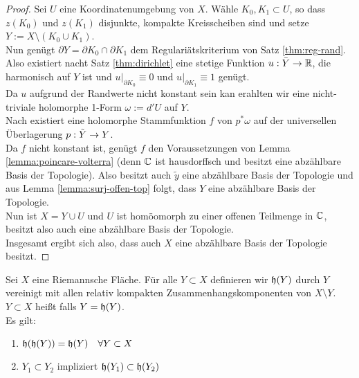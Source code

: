 \begin{proof}
  Sei $U$ eine Koordinatenumgebung von $X$. Wähle $K_0, K_1 \subset
  U$, so dass $z(K_0)$ und $z(K_1)$ disjunkte, kompakte Kreisscheiben
  sind und setze $Y := X \setminus (K_0 \cup K_1)$. \\
  Nun genügt $\partial Y = \partial K_0 \cap \partial K_1$ dem
  Regulariätskriterium von Satz \ref{thm:reg-rand}. Also existiert
  nacht Satz \ref{thm:dirichlet} eine stetige
  Funktion $u: \bar Y \rightarrow \mathbb{R}$, die harmonisch auf $Y$ ist und
  $u|_{\partial K_0} \equiv 0$ und $u|_{\partial K_1} \equiv 1$
  genügt. \\
  Da $u$ aufgrund der Randwerte nicht konstant sein kan erahlten wir
  eine nicht-triviale holomorphe 1-Form $\omega := d' U$ auf $Y$. \\
  Nach \cite[Kor. 10.6]{For} existiert eine holomorphe Stammfunktion
  $f$ von $p^\ast\omega$ auf der universellen Überlagerung $p: \tilde
  Y \rightarrow Y$.\\
  Da $f$ nicht konstant ist, genügt $f$ den Voraussetzungen von
  Lemma \ref{lemma:poincare-volterra} (denn $\mathbb{C}$ ist hausdorffsch
  und besitzt eine abzählbare Basis der Topologie). Also besitzt auch
  $\tilde y$ eine abzählbare Basis der Topologie und aus
  Lemma \ref{lemma:surj-offen-top} folgt, dass $Y$ eine abzählbare
  Basis der Topologie. \\
  Nun ist $X = Y \cup U$ und $U$ ist homöomorph zu einer offenen
  Teilmenge in $\mathbb{C}$, besitzt also auch eine abzählbare Basis der
  Topologie. \\
  Insgesamt ergibt sich also, dass auch $X$ eine abzählbare Basis der
  Topologie besitzt.
\end{proof}

\begin{defin}
  Sei $X$ eine Riemannsche Fläche. Für alle $Y \subset X$ definieren
  wir $\mathfrak{h}(Y)$ durch $Y$ vereinigt mit allen relativ kompakten
  Zusammenhangskomponenten von $X \setminus Y$. \\
  $Y \subset X$ heißt  falls $Y = \mathfrak{h}(Y)$. \\
  Es gilt:
  \begin{enumerate}
  \item $\mathfrak{h}(\mathfrak{h}(Y)) = \mathfrak{h}(Y) \quad \forall Y \subset X$ 
  \item $Y_1 \subset Y_2$ impliziert $\mathfrak{h}(Y_1) \subset \mathfrak{h}(Y_2)$
  \end{enumerate}
\end{defin}

